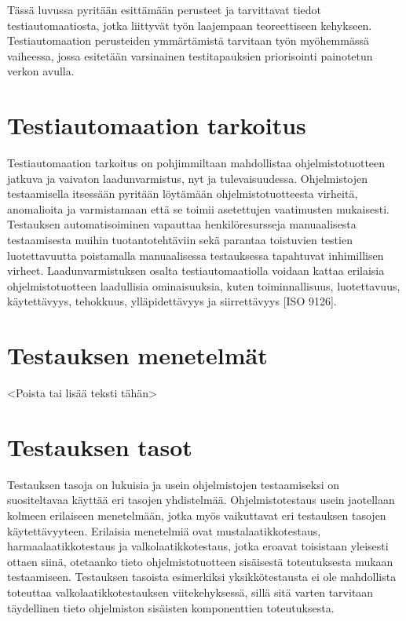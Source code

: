 Tässä luvussa pyritään esittämään perusteet ja tarvittavat tiedot testiautomaatiosta, jotka liittyvät työn laajempaan teoreettiseen kehykseen.
Testiautomaation perusteiden ymmärtämistä tarvitaan työn myöhemmässä vaiheessa, jossa esitetään varsinainen testitapauksien priorisointi painotetun verkon avulla.

\section{Testiautomaation tarkoitus}

Testiautomaation tarkoitus on pohjimmiltaan mahdollistaa ohjelmistotuotteen jatkuva ja vaivaton laadunvarmistus, nyt ja tulevaisuudessa.
Ohjelmistojen testaamisella itsessään pyritään löytämään ohjelmistotuotteesta virheitä, anomalioita ja varmistamaan että se toimii asetettujen vaatimusten mukaisesti.
Testauksen automatisoiminen vapauttaa henkilöresursseja manuaalisesta testaamisesta muihin tuotantotehtäviin sekä parantaa toistuvien testien luotettavuutta poistamalla manuaalisessa testauksessa tapahtuvat inhimillisen virheet.
Laadunvarmistuksen osalta testiautomaatiolla voidaan kattaa erilaisia ohjelmistotuotteen laadullisia ominaisuuksia, kuten toiminnallisuus, luotettavuus, käytettävyys, tehokkuus, ylläpidettävyys ja siirrettävyys [ISO 9126].

\section{Testauksen menetelmät}

<Poista tai lisää teksti tähän>

\section{Testauksen tasot}

Testauksen tasoja on lukuisia ja usein ohjelmistojen testaamiseksi on suositeltavaa käyttää eri tasojen yhdistelmää.
Ohjelmistotestaus usein jaotellaan kolmeen erilaiseen menetelmään, jotka myös vaikuttavat eri testauksen tasojen käytettävyyteen.
Erilaisia menetelmiä ovat mustalaatikkotestaus, harmaalaatikkotestaus ja valkolaatikkotestaus, jotka eroavat toisistaan yleisesti ottaen siinä, otetaanko tieto ohjelmistotuotteen sisäisestä toteutuksesta mukaan testaamiseen.
Testauksen tasoista esimerkiksi yksikkötestausta ei ole mahdollista toteuttaa valkolaatikkotestauksen viitekehyksessä, sillä sitä varten tarvitaan täydellinen tieto ohjelmiston sisäisten komponenttien toteutuksesta.

